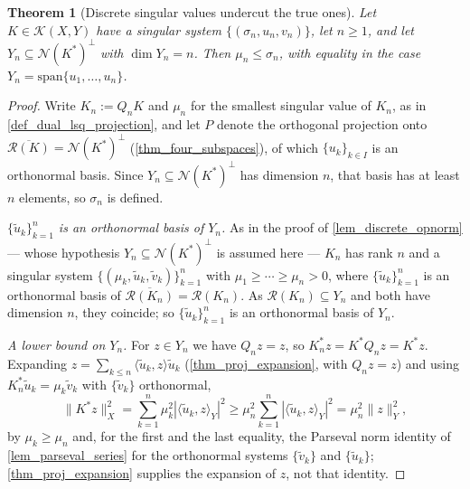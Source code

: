 \documentclass[a4paper]{report}
\theoremstyle{plain}
\newtheorem{theorem}{Theorem}[chapter]
\theoremstyle{definition}
\theoremstyle{remark}
\newcommand{\Kk}{\mathcal{K}}
\newcommand{\Ran}{\mathcal{R}}
\newcommand{\Ker}{\mathcal{N}}
\begin{document}
\begin{theorem}[Discrete singular values undercut the true ones]
  \label{thm_mu_le_sigma}
  Let $K \in \Kk(X,Y)$ have a singular system $\{(\sigma_n,u_n,v_n)\}$, let $n \ge 1$, and
  let $Y_n \subseteq \Ker(K^{*})^{\perp}$ with $\dim Y_n = n$.  Then $\mu_n \le \sigma_n$,
  with equality in the case $Y_n = \mathrm{span}\{u_1,\dots,u_n\}$.
\end{theorem}
\begin{proof}
  Write $K_n := Q_nK$ and $\mu_n$ for the smallest singular value of $K_n$, as in
  \cref{def_dual_lsq_projection}, and let $P$ denote the orthogonal projection onto
  $\overline{\Ran(K)} = \Ker(K^{*})^{\perp}$ (\cref{thm_four_subspaces}), of which
  $\{u_k\}_{k \in I}$ is an orthonormal basis.  Since $Y_n \subseteq \Ker(K^{*})^{\perp}$
  has dimension $n$, that basis has at least $n$ elements, so $\sigma_n$ is defined.

  \emph{$\{\tilde{u}_k\}_{k=1}^{n}$ is an orthonormal basis of $Y_n$.}  As in the proof of
  \cref{lem_discrete_opnorm} --- whose hypothesis $Y_n \subseteq \Ker(K^{*})^{\perp}$ is
  assumed here --- $K_n$ has rank $n$ and a singular system
  $\{(\mu_k,\tilde{u}_k,\tilde{v}_k)\}_{k=1}^{n}$ with
  $\mu_1 \ge \cdots \ge \mu_n > 0$, where $\{\tilde{u}_k\}_{k=1}^{n}$ is an orthonormal
  basis of $\overline{\Ran(K_n)} = \Ran(K_n)$.  As $\Ran(K_n) \subseteq Y_n$ and both have
  dimension $n$, they coincide; so $\{\tilde{u}_k\}_{k=1}^{n}$ is an orthonormal basis of
  $Y_n$.

  \emph{A lower bound on $Y_n$.}  For $z \in Y_n$ we have $Q_nz = z$, so
  $K_n^{*}z = K^{*}Q_nz = K^{*}z$.  Expanding $z = \sum_{k\le n}\langle\tilde{u}_k,
  z\rangle\tilde{u}_k$ (\cref{thm_proj_expansion}, with $Q_nz = z$) and using
  $K_n^{*}\tilde{u}_k = \mu_k\tilde{v}_k$ with $\{\tilde{v}_k\}$ orthonormal,
  \begin{equation}\label{eq_mu_lower}
    \|K^{*}z\|_X^{2} = \sum_{k=1}^{n}\mu_k^{2}|\langle\tilde{u}_k,z\rangle_Y|^{2}
      \ge \mu_n^{2}\sum_{k=1}^{n}|\langle\tilde{u}_k,z\rangle_Y|^{2}
      = \mu_n^{2}\|z\|_Y^{2} ,
  \end{equation}
  by $\mu_k \ge \mu_n$ and, for the first and the last equality, the Parseval norm
  identity of \cref{lem_parseval_series} for the orthonormal systems $\{\tilde{v}_k\}$
  and $\{\tilde{u}_k\}$; \cref{thm_proj_expansion} supplies the expansion of $z$, not that
  identity.


\end{proof}
\end{document}
